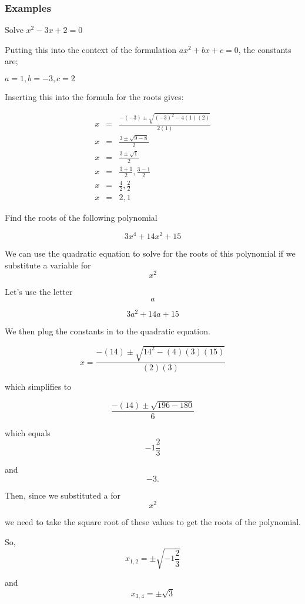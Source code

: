 \documentclass[12pt,a4paper]{article}
\theoremstyle{regla}
\theoremstyle{remark}
\theoremstyle{definition}
\theoremstyle{nonumberbreak}
\begin{document}
\subsubsection{Examples}
\begin{xmpl}

Solve $x^2 - 3x + 2 = 0$

Putting this into the context of the formulation $ax^2+bx+c=0$, the constants are;

$a = 1, b = -3 , c = 2$

Inserting this into the formula for the roots gives:

\begin{eqnarray*}
x &=& \frac{-(-3) \pm \sqrt{(-3)^2 - 4(1)(2)}}{2(1)}\\
x &=& \frac{3 \pm \sqrt{9 - 8}}{2}\\
x &=& \frac{3 \pm \sqrt{1}}{2}\\
x &=& \frac{3 + 1}{2} , \frac{3 - 1}{2}\\
x &=& \frac{4}{2} , \frac{2}{2}\\
x &=& 2 , 1 
\end{eqnarray*}

\end{xmpl}
\begin{xmpl}


Find the roots of the following polynomial

$$3x^{4} + 14x^{2} + 15$$

We can use the quadratic equation to solve for the roots of this polynomial if we substitute a variable for $$x^{2}$$

Let's use the letter $$a$$

$$3a^{2} + 14a + 15$$

We then plug the constants in to the quadratic equation.

$$x = \frac{-(14) \pm \sqrt{14^{2} - (4)(3)(15)}}{(2)(3)}$$

which simplifies to

$$\frac{-(14) \pm \sqrt{196 - 180}}{6}$$

which equals $$-1\frac{2}{3}$$

and $$-3.$$

Then, since we substituted a for $$x^2$$

we need to take the square root of these values to get the roots of the polynomial.

So, $$x_{1,2} = \pm \sqrt{-1\frac{2}{3}}$$

and $$x_{3,4} = \pm \sqrt{3}$$
\end{xmpl}
\end{document}
